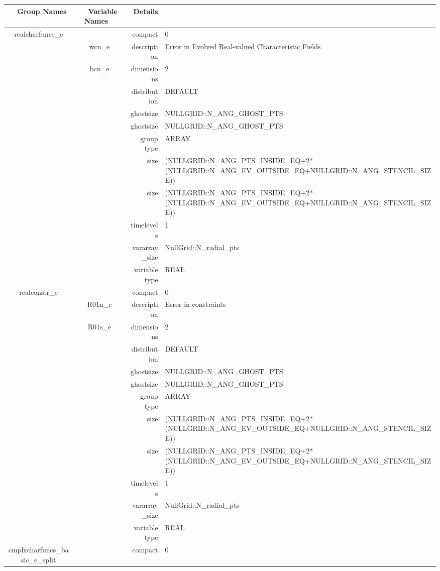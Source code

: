 \begin{tabular*}{150mm}{|c|c@{\extracolsep{\fill}}|rl|} \hline 
~ {\bf Group Names} ~ & ~ {\bf Variable Names} ~  &{\bf Details} ~ & ~\\ 
\hline 
realcharfuncs\_e &  & compact & 0 \\ 
 & wcn\_e & description & Error in Evolved Real-valued Characteristic Fields \\ 
 & bcn\_e & dimensions & 2 \\ 
 &  & distribution & DEFAULT \\ 
 &  & ghostsize & NULLGRID::N\_ANG\_GHOST\_PTS \\ 
& ~ & ghostsize & NULLGRID::N\_ANG\_GHOST\_PTS \\ 
 &  & group type & ARRAY \\ 
 &  & size & (NULLGRID::N\_ANG\_PTS\_INSIDE\_EQ+2*(NULLGRID::N\_ANG\_EV\_OUTSIDE\_EQ+NULLGRID::N\_ANG\_STENCIL\_SIZE)) \\ 
& ~ & size & (NULLGRID::N\_ANG\_PTS\_INSIDE\_EQ+2*(NULLGRID::N\_ANG\_EV\_OUTSIDE\_EQ+NULLGRID::N\_ANG\_STENCIL\_SIZE)) \\ 
 &  & timelevels & 1 \\ 
 &  & vararray\_size & NullGrid::N\_radial\_pts \\ 
 &  & variable type & REAL \\ 
\hline 
realconstr\_e &  & compact & 0 \\ 
 & R01n\_e & description & Error in constraints \\ 
 & R01s\_e & dimensions & 2 \\ 
 &  & distribution & DEFAULT \\ 
 &  & ghostsize & NULLGRID::N\_ANG\_GHOST\_PTS \\ 
& ~ & ghostsize & NULLGRID::N\_ANG\_GHOST\_PTS \\ 
 &  & group type & ARRAY \\ 
 &  & size & (NULLGRID::N\_ANG\_PTS\_INSIDE\_EQ+2*(NULLGRID::N\_ANG\_EV\_OUTSIDE\_EQ+NULLGRID::N\_ANG\_STENCIL\_SIZE)) \\ 
& ~ & size & (NULLGRID::N\_ANG\_PTS\_INSIDE\_EQ+2*(NULLGRID::N\_ANG\_EV\_OUTSIDE\_EQ+NULLGRID::N\_ANG\_STENCIL\_SIZE)) \\ 
 &  & timelevels & 1 \\ 
 &  & vararray\_size & NullGrid::N\_radial\_pts \\ 
 &  & variable type & REAL \\ 
\hline 
cmplxcharfuncs\_basic\_e\_split &  & compact & 0 \\ 

\end{tabular*}
